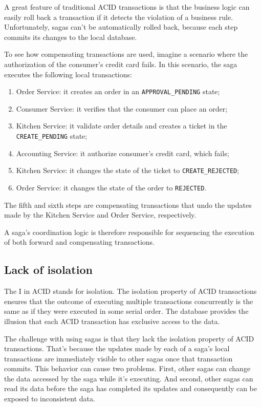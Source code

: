 \documentclass[conference]{IEEEtran}
\begin{document}
A great feature of traditional ACID transactions is that the business logic can easily roll back a transaction if it detects the violation of a business rule. Unfortunately, sagas can’t be automatically rolled back, because each step commits its changes to the local database. 

To see how compensating transactions are used, imagine a scenario where the authorization of the consumer’s credit card fails. In this scenario, the saga executes the following local transactions:

\begin{enumerate}
  \item Order Service: it creates an order in an \texttt{APPROVAL\_PENDING} state;
  \item Consumer Service: it verifies that the consumer can place an order;
  \item Kitchen Service: it validate order details and creates a ticket in the \texttt{CREATE\_PENDING} state;
  \item Accounting Service: it authorize consumer’s credit card, which fails;
  \item Kitchen Service: it changes the state of the ticket to \texttt{CREATE\_REJECTED};
  \item Order Service: it changes the state of the order to \texttt{REJECTED}.
\end{enumerate}

The fifth and sixth steps are compensating transactions that undo the updates made by the Kitchen Service and Order Service, respectively.

A saga’s coordination logic is therefore responsible for sequencing the execution of both forward and compensating transactions. \cite{microservices-patterns-saga}

\subsection{Lack of isolation}

The I in ACID stands for isolation. The isolation property of ACID transactions ensures that the outcome of executing multiple transactions concurrently is the same as if they were executed in some serial order. The database provides the illusion that each ACID transaction has exclusive access to the data.

The challenge with using sagas is that they lack the isolation property of ACID transactions. That’s because the updates made by each of a saga’s local transactions are immediately visible to other sagas once that transaction commits. This behavior can cause two problems. First, other sagas can change the data accessed by the saga while it’s executing. And second, other sagas can read its data before the saga has completed its updates and consequently can be exposed to inconsistent data.
\end{document}
